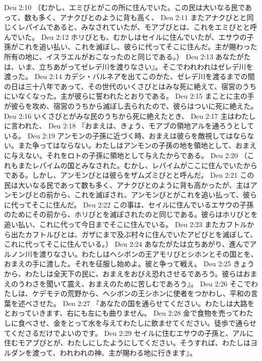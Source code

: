Deu 2:10  （むかし、エミびとがこの所に住んでいた。この民は大いなる民であって、数も多く、アナクびとのように背も高く、
Deu 2:11  またアナクびとと同じくレパイムであると、みなされていたが、モアブびとは、これをエミびとと呼んでいた。
Deu 2:12  ホリびとも、むかしはセイルに住んでいたが、エサウの子孫がこれを追い払い、これを滅ぼし、彼らに代ってそこに住んだ。主が賜わった所有の地に、イスラエルがおこなったのと同じである。）
Deu 2:13  あなたがたは、いま、立ちあがってゼレデ川を渡りなさい』。そこでわれわれはゼレデ川を渡った。
Deu 2:14  カデシ・バルネアを出てこのかた、ゼレデ川を渡るまでの間の日は三十八年であって、その世代のいくさびとはみな死に絶えて、宿営のうちにいなくなった。主が彼らに誓われたとおりである。
Deu 2:15  まことに主の手が彼らを攻め、宿営のうちから滅ぼし去られたので、彼らはついに死に絶えた。
Deu 2:16  いくさびとがみな民のうちから死に絶えたとき、
Deu 2:17  主はわたしに言われた、
Deu 2:18  『おまえは、きょう、モアブの領地アルを通ろうとしている。
Deu 2:19  アンモンの子孫に近づく時、おまえは彼らを敵視してはならない。また争ってはならない。わたしはアンモンの子孫の地を領地として、おまえに与えない。それをロトの子孫に領地として与えたからである。
Deu 2:20  （これもまたレパイムの国とみなされた。むかし、レパイムがここに住んでいたからである。しかし、アンモンびとは彼らをザムズミびとと呼んだ。
Deu 2:21  この民は大いなる民であって数も多く、アナクびとのように背も高かったが、主はアンモンびとの前から、これを滅ぼされ、アンモンびとがこれを追い払って、彼らに代ってそこに住んだ。
Deu 2:22  この事は、セイルに住んでいるエサウの子孫のためにその前から、ホリびとを滅ぼされたのと同じである。彼らはホリびとを追い払い、これに代って今日までそこに住んでいる。
Deu 2:23  またカフトルから出たカフトルびとは、ガザにまで及ぶ村々に住んでいたアビびとを滅ぼして、これに代ってそこに住んでいる。）
Deu 2:24  あなたがたは立ちあがり、進んでアルノン川を渡りなさい。わたしはヘシボンの王アモリびとシホンとその国とを、おまえの手に渡した。それを征服し始めよ。彼と争って戦え。
Deu 2:25  きょうから、わたしは全天下の民に、おまえをおびえ恐れさせるであろう。彼らはおまえのうわさを聞いて震え、おまえのために苦しむであろう』。
Deu 2:26  そこでわたしは、ケデモテの荒野から、ヘシボンの王シホンに使者をつかわし、平和の言葉を述べさせた。
Deu 2:27  『あなたの国を通らせてください。わたしは大路をとおっていきます、右にも左にも曲りません。
Deu 2:28  金で食物を売ってわたしに食べさせ、金をとって水を与えてわたしに飲ませてください。徒歩で通らせてくださるだけでよいのです。
Deu 2:29  セイルに住むエサウの子孫と、アルに住むモアブびとが、わたしにしたようにしてください。そうすれば、わたしはヨルダンを渡って、われわれの神、主が賜わる地に行きます』。

